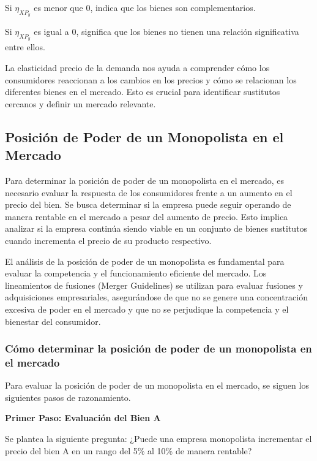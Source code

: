\documentclass[
  a4paper,
]{article}
\begin{document}
Si \(\eta_{XP_y}\) es menor que 0, indica que los bienes son
complementarios.

Si \(\eta_{XP_y}\) es igual a 0, significa que los bienes no tienen una
relación significativa entre ellos.

La elasticidad precio de la demanda nos ayuda a comprender cómo los
consumidores reaccionan a los cambios en los precios y cómo se
relacionan los diferentes bienes en el mercado. Esto es crucial para
identificar sustitutos cercanos y definir un mercado relevante.

\hypertarget{posiciuxf3n-de-poder-de-un-monopolista-en-el-mercado}{%
\subsection{Posición de Poder de un Monopolista en el
Mercado}\label{posiciuxf3n-de-poder-de-un-monopolista-en-el-mercado}}

Para determinar la posición de poder de un monopolista en el mercado, es
necesario evaluar la respuesta de los consumidores frente a un aumento
en el precio del bien. Se busca determinar si la empresa puede seguir
operando de manera rentable en el mercado a pesar del aumento de precio.
Esto implica analizar si la empresa continúa siendo viable en un
conjunto de bienes sustitutos cuando incrementa el precio de su producto
respectivo.

El análisis de la posición de poder de un monopolista es fundamental
para evaluar la competencia y el funcionamiento eficiente del mercado.
Los lineamientos de fusiones (Merger Guidelines) se utilizan para
evaluar fusiones y adquisiciones empresariales, asegurándose de que no
se genere una concentración excesiva de poder en el mercado y que no se
perjudique la competencia y el bienestar del consumidor.

\hypertarget{cuxf3mo-determinar-la-posiciuxf3n-de-poder-de-un-monopolista-en-el-mercado}{%
\subsubsection{Cómo determinar la posición de poder de un monopolista en
el
mercado}\label{cuxf3mo-determinar-la-posiciuxf3n-de-poder-de-un-monopolista-en-el-mercado}}

Para evaluar la posición de poder de un monopolista en el mercado, se
siguen los siguientes pasos de razonamiento.

\textbf{Primer Paso: Evaluación del Bien A}

Se plantea la siguiente pregunta: ¿Puede una empresa monopolista
incrementar el precio del bien A en un rango del 5\% al 10\% de manera
rentable?
\end{document}
